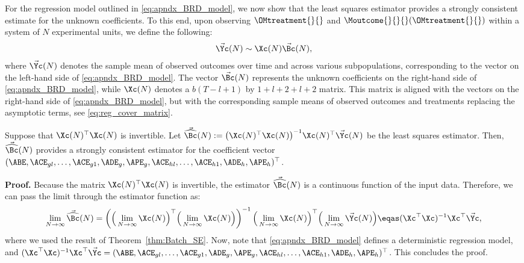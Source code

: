 For the regression model outlined in \eqref{eq:apndx_BRD_model}, we now show that the least squares estimator provides a strongly consistent estimate for the unknown coefficients. To this end, upon observing $\OMtreatment{}{}$ and $\Moutcome{}{}{}(\OMtreatment{}{})$ within a system of $N$ experimental units, we define the following:
%
\begin{align}
    \label{eq:apndx_BRD_reg_model}
    \Vec{\Yc}(N) \sim \Xc(N) \Vec{\Bc}(N),
\end{align}
%
where $\Vec{\Yc}(N)$ denotes the sample mean of observed outcomes over time and across various subpopulations, corresponding to the vector on the left-hand side of \eqref{eq:apndx_BRD_model}. The vector $\Vec{\Bc}(N)$ represents the unknown coefficients on the right-hand side of \eqref{eq:apndx_BRD_model}, while $\Xc(N)$ denotes a $b(T-l+1)$ by $1+l+2+l+2$ matrix. This matrix is aligned with the vectors on the right-hand side of \eqref{eq:apndx_BRD_model}, but with the corresponding sample means of observed outcomes and treatments replacing the asymptotic terms, see \eqref{eq:reg_cover_matrix}.
% 
\begin{proposition}
    \label{prp:BRD_consistency}
    Suppose that $\Xc(N)^\top \Xc(N)$ is invertible. Let $\Vec{\widehat{\Bc}}(N) := \big( \Xc(N)^\top \Xc(N) \big)^{-1} \Xc(N)^\top \Vec{\Yc}(N)$ be the least squares estimator. Then, $\Vec{\widehat{\Bc}}(N)$ provides a strongly consistent estimator for the coefficient vector $(\ABE, \ACE_{gl}, \ldots, \ACE_{g1}, \ADE_g, \APE_g, \ACE_{hl}, \ldots, \ACE_{h1}, \ADE_h, \APE_h)^\top$.
\end{proposition}
% 
\textbf{Proof.}
% 
Because the matrix $\Xc(N)^\top \Xc(N)$ is invertible, the estimator $\Vec{\widehat{\Bc}}(N)$ is a continuous function of the input data. Therefore, we can pass the limit through the estimator function as:
% 
\begin{align*}
    \lim_{N \rightarrow \infty} \Vec{\widehat{\Bc}}(N)
    =
    \left( \Big(\lim_{N \rightarrow \infty} \Xc(N)\Big)^\top \Big(\lim_{N \rightarrow \infty} \Xc(N)\Big) \right)^{-1} \Big(\lim_{N \rightarrow \infty} \Xc(N)\Big)^\top \Big(\lim_{N \rightarrow \infty} \Vec{\Yc}(N)\Big)
    \eqas
    ( \Xc^\top \Xc )^{-1} \Xc^\top \Vec{\Yc},
\end{align*}
% 
where we used the result of Theorem~\ref{thm:Batch_SE}. Now, note that \eqref{eq:apndx_BRD_model} defines a deterministic regression model, and $( \Xc^\top \Xc )^{-1} \Xc^\top \Vec{\Yc} = (\ABE, \ACE_{gl}, \ldots, \ACE_{g1}, \ADE_g, \APE_g, \ACE_{hl}, \ldots, \ACE_{h1}, \ADE_h, \APE_h)^\top$. This concludes the proof. \ep

